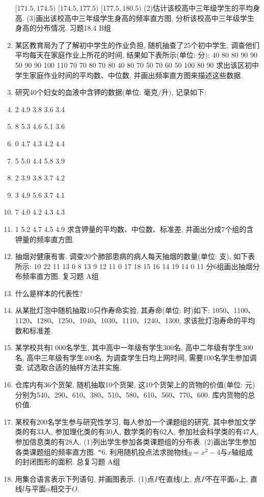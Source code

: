 \documentclass[10pt,a4paper]{article}
\begin{document}
\begin{enumerate}[1.]
$[171.5,174.5)$		
$[174.5,177.5)$		
$[177.5,180.5)$		
(2)估计该校高中三年级学生的平均身高.
(3)画出该校高中三年级学生身高的频率直方图, 分析该校高中三年级学生身高的分布情况.
习题18.4 B组
\item 某区教育局为了了解初中学生的作业负担, 随机抽查了25个初中学生, 调查他们平均每天在家庭作业上所花的时间, 结果如下表所示(单位: 分):
40	80	80	90	90
50	90	90	100	110
70	70	80	70	80
40	80	70	50	70
60	50	100	80	90
求出该区初中学生家庭作业时间的平均数、中位数, 并画出频率直方图来描述这些数据.
\item 研究40个妇女的血液中含钾的数据(单位: 毫克/升), 记录如下:
\item 2	4.9	3.8	3.6	3.4
\item 8	5.3	4.6	5.1	3.6
\item 0	4.7	4.3	4.2	4.4
\item 5	5.0	4.4	5.8	3.9
\item 2	3.9	3.8	3.7	4.2
\item 3	4.9	5.6	3.7	4.1
\item 7	4.0	4.2	4.3	4.3
\item 1	5.2	4.7	4.5	4.9
求含钾量的平均数、中位数、标准差, 并画出分成7个组的含钾量的频率直方图.
\item 抽烟对健康有害. 调查20个肺部患病的病人每天抽烟的数量(单位: 支), 如下表所示:
10	22	11	13	0
8	13	9	12	11
0	17	18	15	16
14	19	14	0	11
分6组画出抽烟分布频率直方图.
复习题
A组
\item 什么是样本的代表性?
\item 从某批灯泡中随机抽取10只作寿命实验, 其寿命(单位: 时)如下: 1050、1100、1120、1280、1250、1040、1030、1110、1240、1300, 求该批灯泡寿命的平均数和标准差.
\item 某学校共有l 000名学生, 其中高中一年级有学生300名, 高中二年级有学生300名, 高中三年级有学生400名, 为调查学生日均上网时间, 需要100名学生参加调查, 试选取合适的抽样方法并实施.
\item 仓库内有36个货架, 随机抽取10个货架, 这10个货架上的货物的价值(单位: 元)分别为540、290、610、380、510、580、610、560、770、600. 库内货物的总价值.
\item 某校有200名学生参与研究性学习, 每人参加一个课题组的研究, 其中参加文学类的有33人, 参加理化类的有30人, 数学类的有62人, 参加社会科学类的有47人, 参加信息类的有28人.
(1)列出学生参加各类课题组的分布表.
(2)画出学生参加各类课题组的频率直方图.
$*$6. 利用随机投点法求抛物线$y=x^2-4$与$x$轴组成的封闭图形的面积.
总复习题
A组
\item 用集合语言表示下列语句, 并画图表示.
(1)点$P$在直线$l$上, 点$P$不在平面$\alpha$上, 直线$l$与平面$\alpha$相交于$O$.

\end{enumerate}
\end{document}
